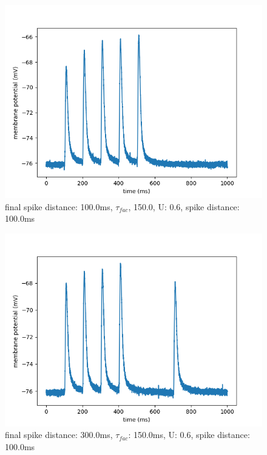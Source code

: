 \documentclass[10pt,a4paper]{scrartcl}
\begin{document}
\begin{figure} [ht]
\begin{center}
\label{fig:abb25}
\caption{final spike distance: 100.0ms, $\tau_{fac}$, 150.0, U: 0.6, spike distance: 100.0ms}
\includegraphics[scale=0.35]{pictures/final_spike_variation_14.pdf} 
\end{center}
\end{figure}

\begin{figure} [ht]
\begin{center}
\label{fig:abb26}
\caption{final spike distance: 300.0ms, $\tau_{fac}$: 150.0ms, U: 0.6, spike distance: 100.0ms}
\includegraphics[scale=0.35]{pictures/final_spike_variation_15.pdf} 
\end{center}
\end{figure}
\end{document}
